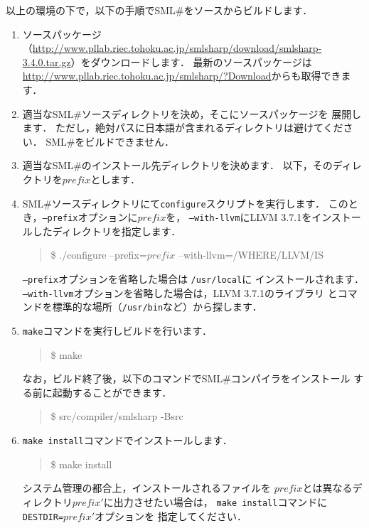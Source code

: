 \documentclass{jbook}
\newcommand{\smlsharp}{SML\#}
\newcommand{\version}{3.4.0}
\newcommand\eurl[1]{{\edef\eurlTMP{{#1}}\expandafter\url\eurlTMP}}
\newenvironment{program}{\begin{quote}\begin{tt}}%
                        {\end{tt}\end{quote}}
\begin{document}
	以上の環境の下で，以下の手順で\smlsharp{}をソースからビルドします．
\begin{enumerate}
\item
	ソースパッケージ（\eurl{http://www.pllab.riec.tohoku.ac.jp/smlsharp/download/smlsharp-\version.tar.gz}）をダウンロードします．
	最新のソースパッケージは
\url{http://www.pllab.riec.tohoku.ac.jp/smlsharp/?Download}からも取得できます．
\item 適当な\smlsharp{}ソースディレクトリを決め，そこにソースパッケージを
展開します．
	ただし，絶対パスに日本語が含まれるディレクトリは避けてください．
	\smlsharp{}をビルドできません．
\item 適当な\smlsharp{}のインストール先ディレクトリを決めます．
	以下，そのディレクトリを$\mathit{prefix}$とします．
\item
	\smlsharp{}ソースディレクトリにて{\tt configure}スクリプトを実行します．
	このとき，{\tt --prefix}オプションに$\mathit{prefix}$を，
{\tt --with-llvm}にLLVM 3.7.1をインストールしたディレクトリを指定します．
\begin{program}
\$ ./configure --prefix=$\mathit{prefix}$ --with-llvm=/WHERE/LLVM/IS
\end{program}
	{\tt --prefix}オプションを省略した場合は {\tt /usr/local}に
インストールされます．
	{\tt --with-llvm}オプションを省略した場合は，LLVM 3.7.1のライブラリ
とコマンドを標準的な場所（{\tt /usr/bin}など）から探します．
\item
	{\tt make}コマンドを実行しビルドを行います．
\begin{program}
\$ make
\end{program}
	なお，ビルド終了後，以下のコマンドで\smlsharp{}コンパイラをインストール
する前に起動することができます．
\begin{program}
\$ src/compiler/smlsharp -Bsrc
\end{program}
\item
	{\tt make install}コマンドでインストールします．
\begin{program}
\$ make install
\end{program}
	システム管理の都合上，インストールされるファイルを
$\mathit{prefix}$とは異なるディレクトリ$\mathit{prefix}'$に出力させたい場合は，
{\tt make install}コマンドに{\tt DESTDIR=$\mathit{prefix}'$}オプションを
指定してください．
\end{enumerate}
\end{document}
